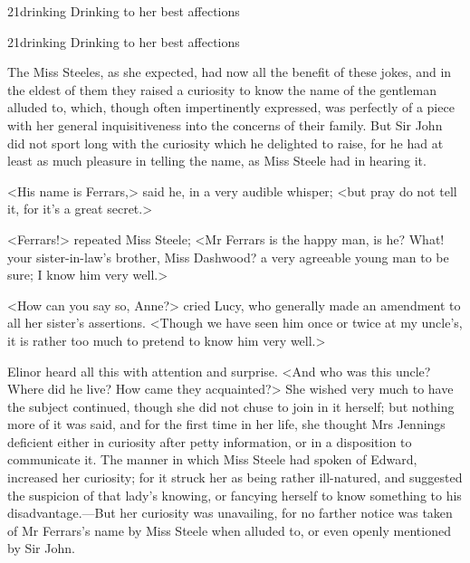 \begin{letter}
\begin{bwbigpic}
	[1.0]
	{21drinking} 
	{Drinking to her best affections} 
\end{bwbigpic}
\end{letter}
\begin{a4}
\begin{bwbigpic}
	[0.9]
	{21drinking} 
	{Drinking to her best affections} 
\end{bwbigpic}
\end{a4}

The Miss Steeles, as she expected, had now all the benefit of these jokes, and in the eldest of them they raised a curiosity to know the name of the gentleman alluded to, which, though often impertinently expressed, was perfectly of a piece with her general inquisitiveness into the concerns of their family. But Sir John did not sport long with the curiosity which he delighted to raise, for he had at least as much pleasure in telling the name, as Miss Steele had in hearing it.

<His name is Ferrars,> said he, in a very audible whisper; <but pray do not tell it, for it's a great secret.>

<Ferrars!> repeated Miss Steele; <Mr Ferrars is the happy man, is he? What! your sister-in-law's brother, Miss Dashwood? a very agreeable young man to be sure; I know him very well.>

<How can you say so, Anne?> cried Lucy, who generally made an amendment to all her sister's assertions. <Though we have seen him once or twice at my uncle's, it is rather too much to pretend to know him very well.>

Elinor heard all this with attention and surprise. <And who was this uncle? Where did he live? How came they acquainted?> She wished very much to have the subject continued, though she did not chuse to join in it herself; but nothing more of it was said, and for the first time in her life, she thought Mrs Jennings deficient either in curiosity after petty information, or in a disposition to communicate it. The manner in which Miss Steele had spoken of Edward, increased her curiosity; for it struck her as being rather ill-natured, and suggested the suspicion of that lady's knowing, or fancying herself to know something to his disadvantage.—But her curiosity was unavailing, for no farther notice was taken of Mr Ferrars's name by Miss Steele when alluded to, or even openly mentioned by Sir John.